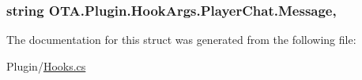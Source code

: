 \subsubsection[{Message}]{\setlength{\rightskip}{0pt plus 5cm}string O\+T\+A.\+Plugin.\+Hook\+Args.\+Player\+Chat.\+Message\hspace{0.3cm}{\ttfamily [get]}, {\ttfamily [set]}}\label{struct_o_t_a_1_1_plugin_1_1_hook_args_1_1_player_chat_ad686be9b4e3abb763b1d9552d3971cd1}


The documentation for this struct was generated from the following file\+:\begin{DoxyCompactItemize}
\item 
Plugin/\hyperlink{_hooks_8cs}{Hooks.\+cs}\end{DoxyCompactItemize}
